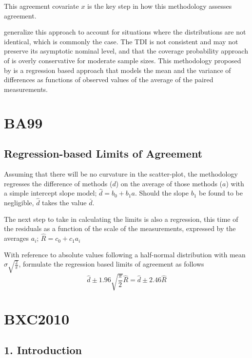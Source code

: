 \documentclass[12pt, a4paper]{report}
\theoremstyle{plain}
\theoremstyle{definition}
\theoremstyle{remark}
\begin{document}
	This agreement covariate $x$ is the key step in how this
	methodology assesses agreement.
	
	\citet{pkcng} generalize this approach to account for situations
	where the distributions are not identical, which is commonly the
	case. The TDI is not consistent and may not preserve its
	asymptotic nominal level, and that the coverage probability
	approach of \citet{lin2002} is overly conservative for moderate
	sample sizes. This methodology proposed by \citet{pkcng} is a
	regression based approach that models the mean and the variance of
	differences as functions of observed values of the average of the
	paired measurements.
	
	
	

\chapter{BA99}

\section{Regression-based Limits of Agreement} Assuming that
there will be no curvature in the scatter-plot, the methodology
regresses the difference of methods ($d$) on the average of those
methods ($a$) with a simple intercept slope model; $\hat{d} =
b_{0}+ b_{1}a.$ Should the slope $b_{1}$ be found to be
negligible, $\hat{d}$ takes the value $\bar{d}$.

The next step to take in calculating the limits is also a
regression, this time of the residuals as a function of the scale
of the measurements, expressed by the averages $a_{i}$;
$ \hat{R} = c_{0}+ c_{1}a_{i}$

With reference to absolute values following a half-normal
distribution with mean $\sigma\sqrt{\frac{2}{\pi}}$, \citet{BA99} formulate the regression based limits of agreement as
follows
\begin{equation}
\hat{d} \pm 1.96\sqrt{\frac{\pi}{2}}\hat{R} = \hat{d} \pm 2.46\hat{R}
\end{equation}

\newpage

\chapter{BXC2010}

\section{1. Introduction}
\end{document}
